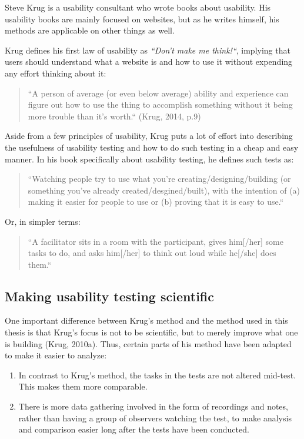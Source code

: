 Steve Krug is a usability consultant who wrote books about usability. His usability books are mainly focused on websites, but as he writes himself, his methods are applicable on other things as well.

Krug defines his first law of usability as \textit{“Don't make me think!“}, implying that users should understand what a website is and how to use it without expending any effort thinking about it:

\begin{quote}
“A person of average (or even below average) ability and experience can figure out how to use the thing to accomplish something without it being more trouble than it's worth.“ (Krug, 2014, p.9)
\end{quote}

Aside from a few principles of usability, Krug puts a lot of effort into describing the usefulness of usability testing and how to do such testing in a cheap and easy manner. In his book specifically about usability testing, he defines such tests as:

\begin{quote}
“Watching people try to use what you're creating/designing/building (or something you've already created/desgined/built), with the intention of (a) making it easier for people to use or (b) proving that it is easy to use.“
\end{quote}

Or, in simpler terms:

\begin{quote}
“A facilitator sits in a room with the participant, gives him[/her] some tasks to do, and asks him[/her] to think out loud while he[/she] does them.“
\end{quote}

\subsection{Making usability testing scientific}

One important difference between Krug's method and the method used in this thesis is that Krug's focus is not to be scientific, but to merely improve what one is building (Krug, 2010a). Thus, certain parts of his method have been adapted to make it easier to analyze:

\begin{enumerate}
	\item In contrast to Krug's method, the tasks in the tests are not altered mid-test. This makes them more comparable.
	\item There is more data gathering involved in the form of recordings and notes, rather than having a group of observers watching the test, to make analysis and comparison easier long after the tests have been conducted.
\end{enumerate}

